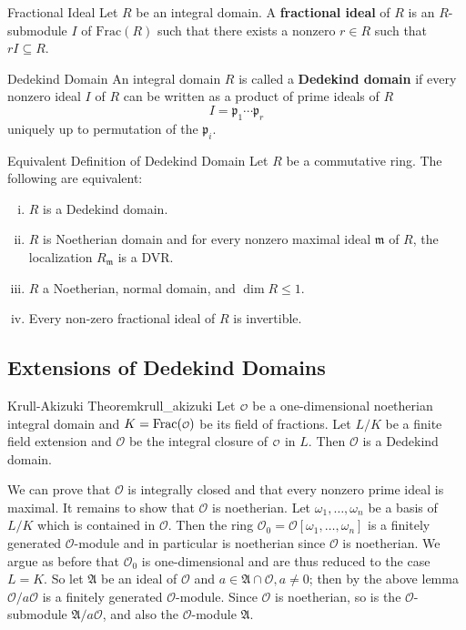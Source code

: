 \begin{definition}{Fractional Ideal}{}
    Let $R$ be an integral domain. A \textbf{fractional ideal} of $R$ is an $R$-submodule $I$ of $\mathrm{Frac}(R)$ such that there exists a nonzero $r\in R$ such that $rI\subseteq R$.
\end{definition}

\begin{definition}{Dedekind Domain}{}
    An integral domain $R$ is called a \textbf{Dedekind domain} if every nonzero ideal $I$ of $R$ can be written as a product of prime ideals of $R$
    \[
    I=\mathfrak{p}_1\cdots\mathfrak{p}_r
    \]
    uniquely up to permutation of the $\mathfrak{p}_i$.
\end{definition}

\begin{proposition}{Equivalent Definition of Dedekind Domain}{}
    Let $R$ be a commutative ring. The following are equivalent:
    \begin{enumerate}[(i)]
        \item $R$ is a Dedekind domain.
        \item $R$ is Noetherian domain and for every nonzero maximal ideal $\mathfrak{m}$ of $R$, the localization $R_{\mathfrak{m}}$ is a DVR.
        \item $R$ a Noetherian, normal domain, and $\dim R\le 1$.
        \item Every non-zero fractional ideal of $R$ is invertible.
    \end{enumerate}
    
\end{proposition}

\subsection{Extensions of Dedekind Domains}
\begin{theorem}{Krull-Akizuki Theorem}{krull_akizuki}
    Let $\mathcalo$ be a one-dimensional noetherian
    integral domain and $K=\mathrm{Frac}(\mathcalo)$ be its field of fractions. Let $L/K$ be a finite field extension and $\mathcal{O}$ be the integral closure of $\mathcalo$ in $L$. Then $\mathcal{O}$ is a Dedekind domain.
\end{theorem}
\begin{prf}
    We can prove that $\mathcal{O}$ is integrally closed and that every nonzero prime ideal is maximal. It remains to show that $\mathcal{O}$ is noetherian. Let $\omega_1, \ldots, \omega_n$ be a basis of $L/K$ which is contained in $\mathcal{O}$. Then the ring $\mathcal{O}_0=\mathcal{O}\left[\omega_1, \ldots, \omega_n\right]$ is a finitely generated $\mathcal{O}$-module and in particular is noetherian since $\mathcal{O}$ is noetherian. We argue as before that $\mathcal{O}_0$ is one-dimensional and are thus reduced to the case $L=K$. So let $\mathfrak{A}$ be an ideal of $\mathcal{O}$ and $a \in \mathfrak{A} \cap \mathcal{O}, a \neq 0$; then by the above lemma $\mathcal{O} / a \mathcal{O}$ is a finitely generated $\mathcal{O}$-module. Since $\mathcal{O}$ is noetherian, so is the $\mathcal{O}$-submodule $\mathfrak{A} / a \mathcal{O}$, and also the $\mathcal{O}$-module $\mathfrak{A}$.
\end{prf}


